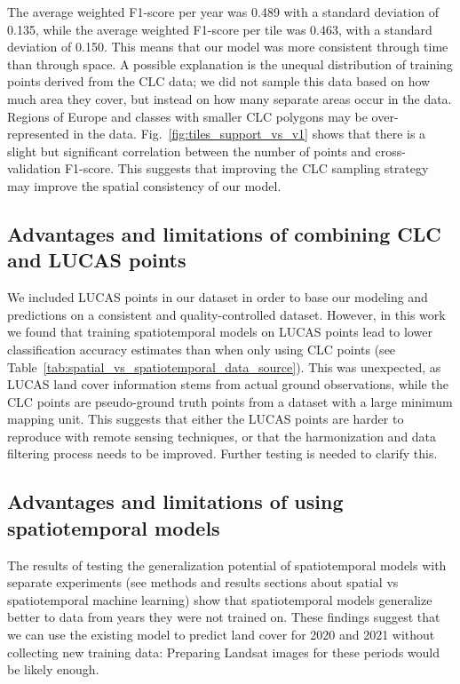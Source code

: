 The average weighted F1-score per year was 0.489 with a standard deviation of 0.135, while the average weighted F1-score per tile was 0.463, with a standard deviation of 0.150. This means that our model was more consistent through time than through space. A possible explanation is the unequal distribution of training points derived from the CLC data; we did not sample this data based on how much area they cover, but instead on how many separate areas occur in the data. Regions of Europe and classes with smaller CLC polygons may be over-represented in the data. Fig.\@~\ref{fig:tiles_support_vs_v1} shows that there is a slight but significant correlation between the number of points and cross-validation F1-score. This suggests that improving the CLC sampling strategy may improve the spatial consistency of our model.

\subsection*{Advantages and limitations of combining CLC and LUCAS points}

We included LUCAS points in our dataset in order to base our modeling and predictions on a consistent and quality-controlled dataset. However, in this work we found that training spatiotemporal models on LUCAS points lead to lower classification accuracy estimates than when only using CLC points (see Table\@~\ref{tab:spatial_vs_spatiotemporal_data_source}). This was unexpected, as LUCAS land cover information stems from actual ground observations, while the CLC points are pseudo-ground truth points from a dataset with a large minimum mapping unit. This suggests that either the LUCAS points are harder to reproduce with remote sensing techniques, or that the harmonization and data filtering process needs to be improved. Further testing is needed to clarify this.

\subsection*{Advantages and limitations of using spatiotemporal models}

The results of testing the generalization potential of spatiotemporal models with separate experiments (see methods and results sections about spatial vs spatiotemporal machine learning) show that spatiotemporal models generalize better to data from years they were not trained on. These findings suggest that we can use the existing model to predict land cover for 2020 and 2021 without collecting new training data: Preparing Landsat images for these periods would be likely enough.
    
